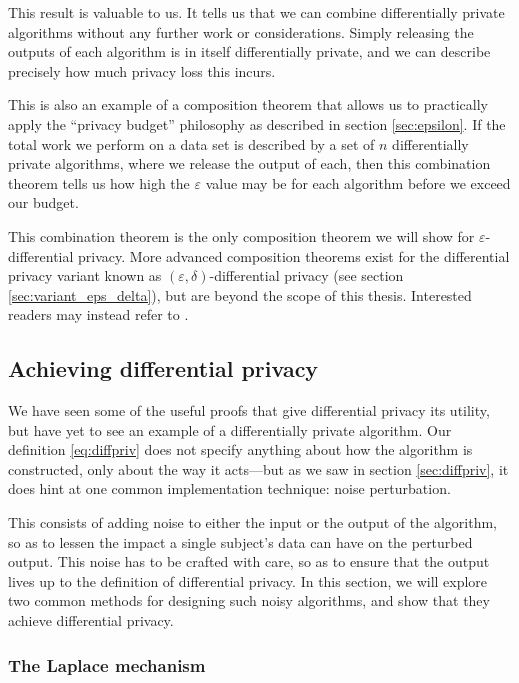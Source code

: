 \documentclass[a4paper,12pt]{article}
\renewcommand{\epsilon}{\varepsilon}
\begin{document}
This result is valuable to us. It tells us that we can combine differentially private algorithms without any further work or considerations. Simply releasing the outputs of each algorithm is in itself differentially private, and we can describe precisely how much privacy loss this incurs.

This is also an example of a composition theorem that allows us to practically apply the ``privacy budget'' philosophy as described in section \ref{sec:epsilon}. If the total work we perform on a data set is described by a set of $n$ differentially private algorithms, where we release the output of each, then this combination theorem tells us how high the $\epsilon$ value may be for each algorithm before we exceed our budget.

This combination theorem is the only composition theorem we will show for $\epsilon$-differential privacy. More advanced composition theorems exist for the differential privacy variant known as $(\epsilon,\delta)$-differential privacy (see section \ref{sec:variant_eps_delta}), but are beyond the scope of this thesis. Interested readers may instead refer to \cite[ch.~3]{dwork_privacybook}.

\subsection{Achieving differential privacy \label{sec:achieving}}

We have seen some of the useful proofs that give differential privacy its utility, but have yet to see an example of a differentially private algorithm. Our definition \ref{eq:diffpriv} does not specify anything about how the algorithm is constructed, only about the way it acts---but as we saw in section \ref{sec:diffpriv}, it does hint at one common implementation technique: noise perturbation.

This consists of adding noise to either the input or the output of the algorithm, so as to lessen the impact a single subject's data can have on the perturbed output. This noise has to be crafted with care, so as to ensure that the output lives up to the definition of differential privacy. In this section, we will explore two common methods for designing such noisy algorithms, and show that they achieve differential privacy. 

\subsubsection{The Laplace mechanism}
\end{document}
